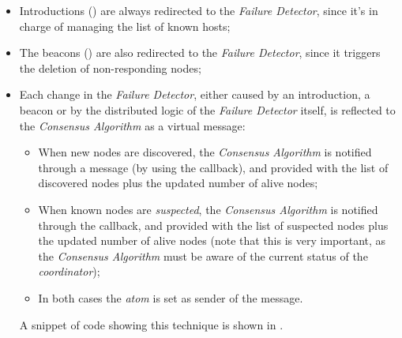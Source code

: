 \begin{itemize}
    \item   Introductions () are always
            redirected to the \emph{Failure Detector}, since it's in
            charge of managing the list of known hosts;

    \item   The beacons () are also redirected to
            the \emph{Failure Detector}, since it triggers the deletion of
            non-responding nodes;

    \item   Each change in the \emph{Failure Detector}, either caused by an
            introduction, a beacon or by the distributed logic of the
            \emph{Failure Detector} itself, is reflected to the
            \emph{Consensus Algorithm} as a virtual message:

        \begin{itemize}

        \item   When new nodes are discovered, the \emph{Consensus
                Algorithm} is notified through a message (by using the
                 callback), and provided
                with the list of discovered nodes plus the updated number
                of alive nodes;

        \item   When known nodes are \emph{suspected}, the \emph{Consensus
                Algorithm} is notified through the
                 callback, and provided
                with the list of suspected nodes plus the updated number
                of alive nodes (note that this is very important, as the
                \emph{Consensus Algorithm} must be aware of the current
                status of the \emph{coordinator});

        \item   In both cases the \emph{atom}  is set as
                sender of the message.

        \end{itemize}

            A snippet of code showing this technique is shown in
            .


\end{itemize}
